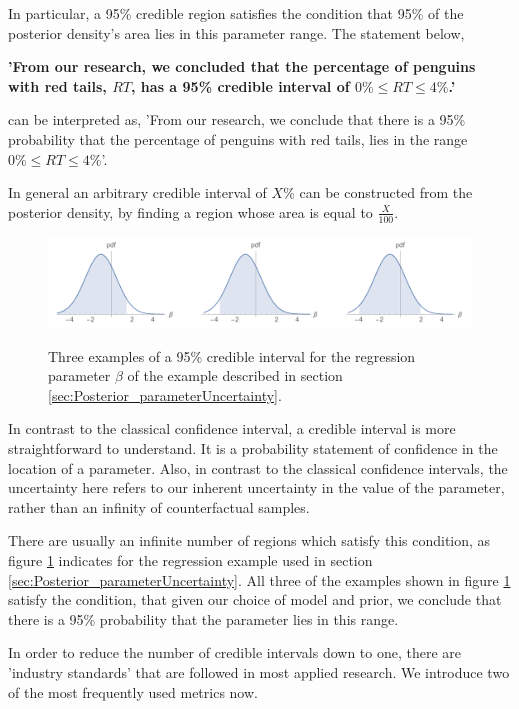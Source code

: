 \documentclass[11pt,fullpage]{book}
\begin{document}
In particular, a 95\% credible region satisfies the condition that 95\% of the posterior density's area lies in this parameter range. The statement below,

\textbf{'From our research, we concluded that the percentage of penguins with red tails, $RT$, has a 95\% credible interval of $0\%\leq RT \leq 4\%$.'}

can be interpreted as, 'From our research, we conclude that there is a 95\% probability that the percentage of penguins with red tails, lies in the range $0\%\leq RT \leq 4\%$'.

In general an arbitrary credible interval of $X$\% can be constructed from the posterior density, by finding a region whose area is equal to $\frac{X}{100}$. 

\begin{figure}
\centering
\scalebox{0.35} 
{\includegraphics{Posterior_infiniteCredibleIntervals.pdf}}
\caption{Three examples of a 95\% credible interval for the regression parameter $\beta$ of the example described in section \ref{sec:Posterior_parameterUncertainty}.}\label{fig:Posterior_infiniteCredibleIntervals}
\end{figure}

In contrast to the classical confidence interval, a credible interval is more straightforward to understand. It is a probability statement of confidence in the location of a parameter. Also, in contrast to the classical confidence intervals, the uncertainty here refers to our inherent uncertainty in the value of the parameter, rather than an infinity of counterfactual samples.

There are usually an infinite number of regions which satisfy this condition, as figure \ref{fig:Posterior_infiniteCredibleIntervals} indicates for the regression example used in section \ref{sec:Posterior_parameterUncertainty}. All three of the examples shown in figure \ref{fig:Posterior_infiniteCredibleIntervals} satisfy the condition, that given our choice of model and prior, we conclude that there is a 95\% probability that the parameter lies in this range. 

In order to reduce the number of credible intervals down to one, there are 'industry standards' that are followed in most applied research. We introduce two of the most frequently used metrics now.
\end{document}
